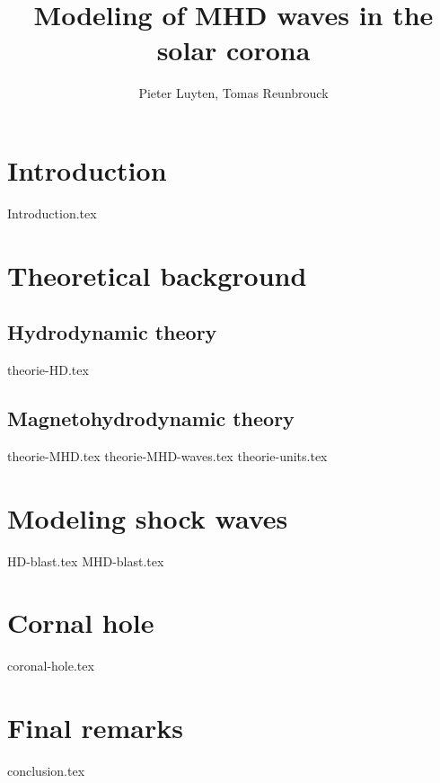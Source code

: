 \documentclass[a4paper]{article}
\title{Modeling of MHD waves in the solar corona}
\author{Pieter Luyten, Tomas Reunbrouck}
\begin{document}
\maketitle
\newpage
\tableofcontents
\newpage

\section{Introduction}
{Introduction.tex}


\section{Theoretical background}

\subsection{Hydrodynamic theory}
{theorie-HD.tex}

\subsection{Magnetohydrodynamic theory}
{theorie-MHD.tex}
{theorie-MHD-waves.tex}
{theorie-units.tex}
\newpage

\section{Modeling shock waves}
{HD-blast.tex}
\newpage
{MHD-blast.tex}
\newpage

\section{Cornal hole}
{coronal-hole.tex}
\newpage

\section{Final remarks}
{conclusion.tex}


\end{document}
